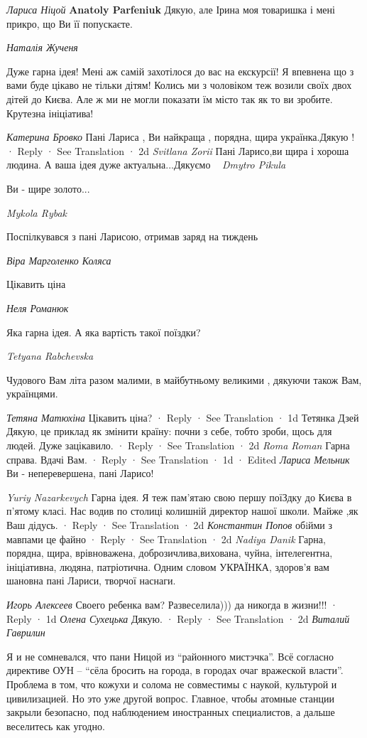 \emph{Лариса Ніцой}
\textbf{Anatoly Parfeniuk} Дякую, але Ірина моя товаришка і мені прикро, що Ви її попускаєте.

\emph{Наталія Жученя}

Дуже гарна ідея! Мені аж самій захотілося до вас на екскурсії! Я впевнена що з
вами буде цікаво не тільки дітям! Колись ми з чоловіком теж возили своїх двох
дітей до Києва. Але ж ми не могли показати їм місто так як то ви зробите.
Крутезна ініціатива!

\emph{Катерина Бровко}
Пані Лариса , Ви найкраща , порядна, щира українка.Дякую !
 · Reply · See Translation · 2d
\emph{Svitlana Zorii}
Пані Ларисо,ви щира і хороша людина.
А ваша ідея дуже актуальна...Дякуємо💛💕💙
\emph{Dmytro Pikula}

Ви - щире золото...

\emph{Mykola Rybak}

Поспілкувався з пані Ларисою, отримав заряд на тиждень💙💛

\emph{Віра Марголенко Коляса}

Цікавить ціна

\emph{Неля Романюк}

Яка гарна ідея. А яка вартість такої поїздки?

\emph{Tetyana Rabchevska}

Чудового Вам літа разом малими, в майбутньому великими , дякуючи також Вам, українцями.

\emph{Тетяна Матюхіна}
Цікавить ціна?
 · Reply · See Translation · 1d
Тетянка Дзей
Дякую, це приклад як змінити країну: почни з себе, тобто зроби, щось для людей. Дуже зацікавило.
 · Reply · See Translation · 2d
\emph{Roma Roman}
Гарна справа. Вдачі Вам.
 · Reply · See Translation · 1d · Edited
\emph{Лариса Мельник}
Ви - неперевершена, пані Ларисо!

\emph{Yuriy Nazarkevych}
Гарна ідея. Я теж пам'ятаю свою першу поїЗдку до Києва в п'ятому класі. Нас водив по столиці колишній директор нашої школи. Майже ,як Ваш дідусь.
 · Reply · See Translation · 2d
\emph{Константин Попов}
обiйми з мавпами це файно
 · Reply · See Translation · 2d
\emph{Nadiya Danik}
Гарна, порядна, щира, врівноважена, доброзичлива,вихована, чуйна, інтелегентна, ініціативна, людяна, патріотична.
Одним словом УКРАЇНКА, здоров'я вам шановна пані Лариси, творчої наснаги.

\emph{Игорь Алексеев}
Своего ребенка вам? Развеселила))) да никогда в жизни!!!
 · Reply · 1d
\emph{Олена Сухецька}
Дякую.
 · Reply · See Translation · 2d
\emph{Виталий Гаврилин}

Я и не сомневался, что пани Ницой из \enquote{районного мистэчка}. Всё согласно
директиве ОУН -- \enquote{сёла бросить на города, в городах очаг вражеской
власти}.  Проблема в том, что кожухи и солома не совместимы с наукой, культурой
и цивилизацией. Но это уже другой вопрос. Главное, чтобы атомные станции
закрыли безопасно, под наблюдением иностранных специалистов, а дальше
веселитесь как угодно.
